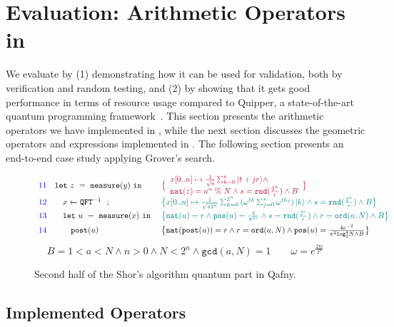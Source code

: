 \section{Evaluation: Arithmetic Operators in \oqasm}
\label{sec:arith-oqasm}

We evaluate \name by (1) demonstrating how it can be used for validation, both by verification and random testing, and (2) by showing that it gets good performance in terms of resource usage compared to Quipper, a state-of-the-art quantum programming framework~\cite{Green2013}.
%
This section presents the arithmetic operators we have implemented in
\oqasm, while the next section discusses the geometric operators and
expressions implemented in \vqimp. The following section presents an
end-to-end case study applying Grover's search.

\begin{figure}[t]
{\small
\[
\begin{array}{r l  l}
\textcolor{blue}{11}
&
\sexp{z}{\smea{y}}{}
&
\textcolor{purple}{
\big{\{}
\begin{array}{l}
x[0..n] \mapsto \smch{\frac{1}{\sqrt{s}}}{s}{t+jr} 
\wedge
\\
\texttt{nat}(z)=a^{n}\;\%\;N
\wedge
s=\texttt{rnd}(\frac{2^n}{r}) \wedge B
\end{array}
\big{\}}
}
\\[0.4em]
\textcolor{blue}{12}
&
\quad\ssassign{x}{}{\iqft[-1]{}{}}; 
&
\textcolor{teal}{
\big{\{}
x[0..n] \mapsto \smich{\frac{1}{\sqrt{s 2^n}}}{2^n}{(\omega^{tk}\Msum_{j=0}^{s}\omega^{tkj})}{k} 
\wedge
s=\texttt{rnd}(\frac{2^n}{r}) \wedge B
\big{\}}
}
\\[0.4em]
\textcolor{blue}{13}
&
\quad\sexp{u}{\smea{x}}{}
&
\textcolor{teal}{
\big{\{}
\texttt{nat}(u)=r \wedge \texttt{pos}(u)=\frac{4}{\pi ^ {2 r}}
\wedge
s=\texttt{rnd}(\frac{2^n}{r}) \wedge r = \texttt{ord}(a,N) \wedge B
\big{\}}
}
\\[0.4em]
\textcolor{blue}{14}
&
\quad\quad\texttt{post}(u)
&
\big{\{}
\texttt{nat}(\texttt{post}(u))=r \wedge r = \texttt{ord}(a,N) \wedge \texttt{pos}(u)=\frac{4e^{-2}}{\pi^2 \texttt{log}_2^4 N \wedge B}
\big{\}}
\end{array}
\]
}
{\footnotesize
\[
B=1 < a < N \wedge n > 0 \wedge N < 2^n \wedge \texttt{gcd}(a,N)=1
\qquad
\omega=e^{\frac{2\pi i}{2^n}}
\]
}
\caption{Second half of the Shor's algorithm quantum part in Qafny.}
\label{fig:shorqafny2}
\end{figure}


\subsection{Implemented Operators}


